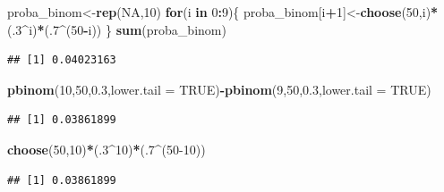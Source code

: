 \documentclass[
]{article}
\newenvironment{Shaded}{\begin{snugshade}}{\end{snugshade}}
\newcommand{\AttributeTok}[1]{\textcolor[rgb]{0.13,0.29,0.53}{#1}}
\newcommand{\ConstantTok}[1]{\textcolor[rgb]{0.56,0.35,0.01}{#1}}
\newcommand{\ControlFlowTok}[1]{\textcolor[rgb]{0.13,0.29,0.53}{\textbf{#1}}}
\newcommand{\DecValTok}[1]{\textcolor[rgb]{0.00,0.00,0.81}{#1}}
\newcommand{\FloatTok}[1]{\textcolor[rgb]{0.00,0.00,0.81}{#1}}
\newcommand{\FunctionTok}[1]{\textcolor[rgb]{0.13,0.29,0.53}{\textbf{#1}}}
\newcommand{\NormalTok}[1]{#1}
\newcommand{\OtherTok}[1]{\textcolor[rgb]{0.56,0.35,0.01}{#1}}
\newcommand{\SpecialCharTok}[1]{\textcolor[rgb]{0.81,0.36,0.00}{\textbf{#1}}}
\begin{document}
\begin{Shaded}
\begin{Highlighting}[]
\NormalTok{proba\_binom}\OtherTok{\textless{}{-}}\FunctionTok{rep}\NormalTok{(}\ConstantTok{NA}\NormalTok{,}\DecValTok{10}\NormalTok{)}
\ControlFlowTok{for}\NormalTok{(i }\ControlFlowTok{in} \DecValTok{0}\SpecialCharTok{:}\DecValTok{9}\NormalTok{)\{}
\NormalTok{proba\_binom[i}\SpecialCharTok{+}\DecValTok{1}\NormalTok{]}\OtherTok{\textless{}{-}}\FunctionTok{choose}\NormalTok{(}\DecValTok{50}\NormalTok{,i)}\SpecialCharTok{*}\NormalTok{(.}\DecValTok{3}\SpecialCharTok{\^{}}\NormalTok{i)}\SpecialCharTok{*}\NormalTok{(.}\DecValTok{7}\SpecialCharTok{\^{}}\NormalTok{(}\DecValTok{50}\SpecialCharTok{{-}}\NormalTok{i)) \}}
\FunctionTok{sum}\NormalTok{(proba\_binom)}
\end{Highlighting}
\end{Shaded}

\begin{verbatim}
## [1] 0.04023163
\end{verbatim}

\begin{Shaded}
\begin{Highlighting}[]
\FunctionTok{pbinom}\NormalTok{(}\DecValTok{10}\NormalTok{,}\DecValTok{50}\NormalTok{,}\FloatTok{0.3}\NormalTok{,}\AttributeTok{lower.tail =} \ConstantTok{TRUE}\NormalTok{)}\SpecialCharTok{{-}}\FunctionTok{pbinom}\NormalTok{(}\DecValTok{9}\NormalTok{,}\DecValTok{50}\NormalTok{,}\FloatTok{0.3}\NormalTok{,}\AttributeTok{lower.tail =} \ConstantTok{TRUE}\NormalTok{)}
\end{Highlighting}
\end{Shaded}

\begin{verbatim}
## [1] 0.03861899
\end{verbatim}

\begin{Shaded}
\begin{Highlighting}[]
\FunctionTok{choose}\NormalTok{(}\DecValTok{50}\NormalTok{,}\DecValTok{10}\NormalTok{)}\SpecialCharTok{*}\NormalTok{(.}\DecValTok{3}\SpecialCharTok{\^{}}\DecValTok{10}\NormalTok{)}\SpecialCharTok{*}\NormalTok{(.}\DecValTok{7}\SpecialCharTok{\^{}}\NormalTok{(}\DecValTok{50{-}10}\NormalTok{))}
\end{Highlighting}
\end{Shaded}

\begin{verbatim}
## [1] 0.03861899
\end{verbatim}
\end{document}
